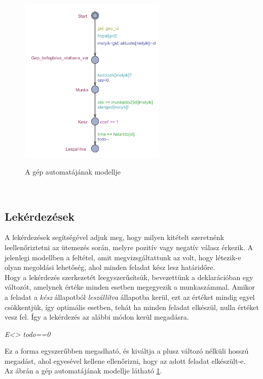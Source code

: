 \documentclass {report}
\begin{document}
    \begin{figure}[htpb]
        \begin{center}
        \label{tab:gepautomat}
       \includegraphics[height=8cm]{Feladat}\\
        \caption{A gép automatájának modellje}
        \end{center}
        \end{figure}
    \\    
   
    \subsection{Lekérdezések}
    A lekérdezések segítségével adjuk meg, hogy milyen kitételt szeretnénk leellenőriztetni az ütemezés során, melyre pozitív vagy negatív válasz érkezik. A jelenlegi modellben a feltétel, amit megvizsgáltattunk az volt, hogy létezik-e olyan megoldási lehetőség, ahol minden feladat kész lesz határidőre.\\
    Hogy a lekérdezés szerkezetét leegyszerűsítsük, bevezettünk a deklarációban egy változót, amelynek értéke minden esetben megegyezik a munkaszámmal. Amikor a feladat a \emph{kész} állapotból \emph{leszállítva} állapotba kerül, ezt az értéket mindig egyel csökkentjük, így optimális esetben, tehát ha minden feladat elkészül, nulla értéket vesz fel. Így a lekérdezés az alábbi módon kerül megadásra.
    \begin{center}
	\emph{E<> todo==0}
    \end{center}
    Ez a forma egyszerűbben megadható, és kiváltja a plusz változó nélküli hosszú megadást, ahol egyesével kellene ellenőrizni, hogy az adott feladat elkészült-e. \\
    Az ábrán a gép automatájának modellje látható \ref{tab:gepautomat}.
    
\end{document}
